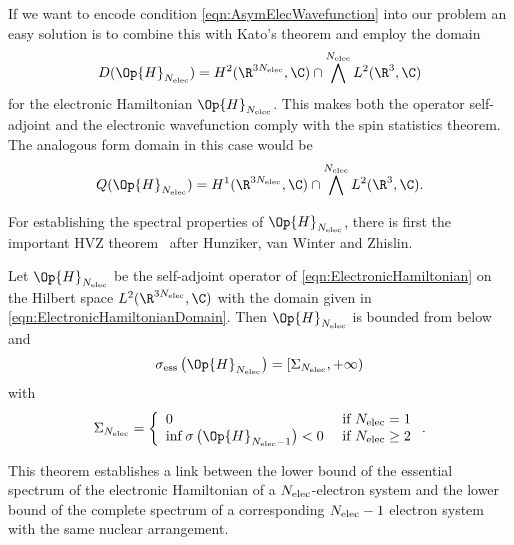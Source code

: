 If we want to encode condition \eqref{eqn:AsymElecWavefunction}
into our problem an easy solution is to combine this with Kato's theorem
and employ the domain
\begin{equation}
	D(\Op{H}_{\Nelec}) = H^2(\R^{3\Nelec}, \C) \cap \bigwedge^{\Nelec} L^2(\R^3, \C)
	\label{eqn:ElectronicHamiltonianDomain}
\end{equation}
for the electronic Hamiltonian $\Op{H}_{\Nelec}$.
This makes both the operator self-adjoint and the electronic wavefunction
comply with the spin statistics theorem.
The analogous form domain in this case would be
\[ Q(\Op{H}_{\Nelec}) = H^1(\R^{3\Nelec}, \C) \cap \bigwedge^{\Nelec} L^2(\R^3, \C). \]

For establishing the spectral properties of $\Op{H}_{\Nelec}$,
there is first the important HVZ theorem~\cite{Zhislin1959,Zhislin1960,Reed1978,Teschl2014}
after Hunziker, van Winter and Zhislin.
\begin{thm}[HVZ]
	\label{thm:HVZ}
	Let $\Op{H}_{\Nelec}$ be the self-adjoint operator of \eqref{eqn:ElectronicHamiltonian}
	on the Hilbert space $L^2(\R^{3\Nelec}, \C)$
	with the domain given in \eqref{eqn:ElectronicHamiltonianDomain}.
	Then $\Op{H}_{\Nelec}$ is bounded from below and
	\[ \sigma_\text{ess}\left(\Op{H}_{\Nelec}\right) = [\Sigma_{\Nelec}, +\infty) \]
	with
	\[ \Sigma_{\Nelec} = \left\{
		\begin{array}{ll}
			0 & \text{ if $\Nelec = 1$} \\
			\inf \sigma\left(\Op{H}_{\Nelec-1}\right) < 0 & \text{ if $\Nelec \geq 2$}
		\end{array}
		\right. .
	\]
\end{thm}
This theorem establishes a link between
the lower bound of the essential spectrum
of the electronic Hamiltonian of a $N_\text{elec}$-electron system
and the lower bound of the complete spectrum of
a corresponding $N_\text{elec} - 1$ electron system
with the same nuclear arrangement.

